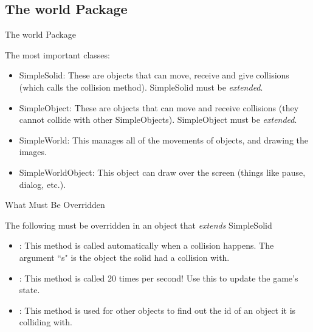 \subsection{The world Package}

\begin{frame}{The world Package}
\begin{center}The most important classes:\end{center}
\begin{itemize}
\item SimpleSolid: These are objects that can move, receive and give collisions (which calls the collision method). SimpleSolid must be \emph{extended}.\pause
\item SimpleObject: These are objects that can move and receive collisions (they cannot collide with other SimpleObjects). SimpleObject must be \emph{extended}.\pause
\item SimpleWorld: This manages all of the movements of objects, and drawing the images.\pause
\item SimpleWorldObject: This object can draw over the screen (things like pause, dialog, etc.).
\end{itemize}
\end{frame}

\begin{frame}{What Must Be Overridden}
\begin{center}
The following must be overridden in an object that \emph{extends} SimpleSolid
\end{center}
\begin{itemize}
\item {}: This method is called automatically when a collision happens. The argument ``s" is the object the solid had a collision with.
\item {}: This method is called 20 times per second! Use this to update the game's state.
\item {}: This method is used for other objects to find out the id of an object it is colliding with.
\end{itemize}
\end{frame}

